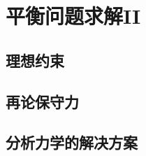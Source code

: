 

\section{平衡问题求解II}\label{4-4}

\subsection{理想约束}\label{4-4-1}

\subsection{再论保守力}\label{4-4-2}

\subsection{分析力学的解决方案}\label{4-4-3}